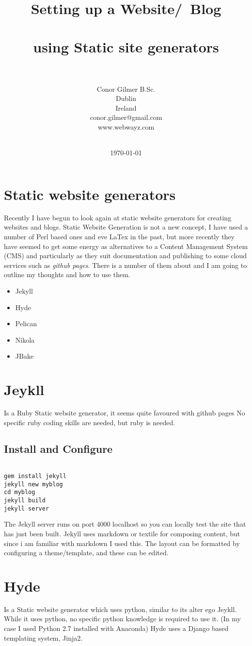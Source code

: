 \documentclass[12pt]{article}			%
\title{Setting up a Website/\ Blog\\~\\ using Static site generators\\~\\}	%
\author{	Conor Gilmer B.Sc.\\	%
		Dublin \\
		Ireland \\
		conor.gilmer@gmail.com\\
		www.webwayz.com\\~\\
		}
\date{\today}				%
\begin{document}
\maketitle
\newpage
\tableofcontents
\newpage

\section{Static website generators}
Recently I have begun to look again at static website generators for creating websites and blogs. Static Website Generation is not a new concept, I have used a number of Perl based ones and eve LaTex in the past, but more recently they have seemed to get some energy as alternatives to a Content Management System (CMS) and particularly as they suit documentation and publishing to some cloud services such as \textit{github pages}. There is a number of them about and I am going to outline my thoughts and how to use them.
\begin{itemize}
\item Jekyll
\item Hyde
\item Pelican
\item Nikola
\item JBake
\end{itemize}


\newpage
\section{Jeykll}
Is a Ruby Static website generator, it seems quite favoured with github pages
No specific ruby coding skills are needed, but ruby is needed.
\subsection{Install and Configure}

\begin{verbatim}

gem install jekyll
jekyll new myblog
cd myblog
jekyll build
jekyll server

\end{verbatim}
The Jekyll server runs on port 4000 localhost so you can locally test the site that has just been built.
Jekyll uses markdown or textile for composing content, but since i am familiar with markdown I used this. The layout can be formatted by configuring a theme/template, and these can be edited.


\newpage
\section{Hyde}
Is a Static website generator which uses python, similar to its alter ego Jeykll.
While it uses python, no specific python knowledge is required to use it. (In my case I used Python 2.7 installed with Anaconda) Hyde uses a Django based templating system, Jinja2. 
\end{document}
